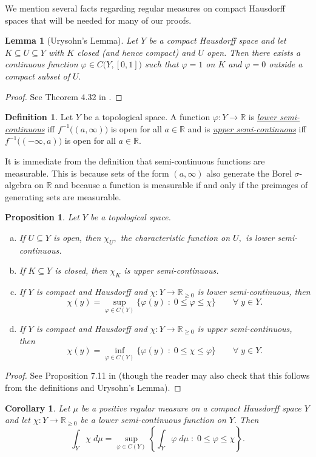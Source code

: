 \documentclass[12pt]{article}
\edef\t{\pgfmathresult}%
\theoremstyle{theorem}
\newtheorem{lemma}[equation]{Lemma}
\newtheorem{proposition}[equation]{Proposition}
\newtheorem{corollary}[equation]{Corollary}
\theoremstyle{definition}
\newtheorem{definition}[equation]{Definition}
\numberwithin{equation}{section}
\let\s=\sigma \let\t=\tau \let\u=\upsilon \let\f=\phi \let\c=\chi
\def\vf{\varphi}
\newcommand{\be}{\begin{equation}}
\newcommand{\ee}{\end{equation}}
\newcommand{\bc}{\begin{corollary}}
\newcommand{\ec}{\end{corollary}}
\newcommand{\blem}{\begin{lemma}}
\newcommand{\elem}{\end{lemma}}
\newcommand{\bn}{\begin{proposition}}
\newcommand{\en}{\end{proposition}}
\newcommand{\bd}{\begin{definition}}
\newcommand{\ed}{\end{definition}}
\newcommand{\bprf}{\begin{proof}}
\newcommand{\eprf}{\end{proof}}
\newcommand{\<}{\langle}
\renewcommand{\>}{\rangle}
\def\R{{{\mathbb R}}}
\begin{document}
We mention several facts regarding regular measures on compact
Hausdorff spaces that will be needed for many of our proofs. 

\blem
[Urysohn's Lemma]
\label{lem:Urysohn}
Let $Y$ be a compact Hausdorff space and let $K\subseteq U\subseteq Y$ with
$K$ closed (and hence compact) and $U$ open. 
Then there exists a continuous function $\vf\in C\big(Y,[0,1]\big)$ such that 
$\vf=1$ on $K$ and $\vf=0$ outside a compact subset of $U.$ 
\elem

\bprf
See Theorem 4.32 in \cite{Fo07}. 
\eprf

\bd
Let $Y$ be a topological space. A function $\vf:Y\to\R$ is
\emph{\uline{lower semi-continuous}} iff 
$f^{-1}\big((a,\infty)\big)$ is open for all $a\in\R$
and is 
\emph{\uline{upper semi-continuous}} iff 
$f^{-1}\big((-\infty,a)\big)$ is open for all $a\in\R.$
\ed

It is immediate from the definition that semi-continuous functions are
measurable. This is because sets of the form $(a,\infty)$ also generate
the Borel $\s$-algebra on $\R$ and because a function is measurable if and 
only if the preimages of generating sets are measurable.   

\bn
\label{prop:semicontinuous}
Let $Y$ be a topological space. 
\begin{enumerate}[(a)]
\setlength{\itemsep}{0pt}
\item
If $U\subseteq Y$ is open, then $\chi_{U},$ the characteristic
function on $U,$ is lower semi-continuous. 
\item
If $K\subseteq Y$ is closed, then $\chi_{K}$ is upper semi-continuous. 
\item
If $Y$ is compact and Hausdorff and $\chi:Y\to\R_{\ge0}$ is 
lower semi-continuous, then 
\be
\chi(y)=\sup_{\vf\in C(Y)}\big\{\vf(y)\;:\;0\le\vf\le\chi\big\}
\qquad\forall\;y\in Y.
\ee
\item
If $Y$ is compact and Hausdorff and $\chi:Y\to\R_{\ge0}$ is 
upper semi-continuous, then 
\be
\chi(y)=\inf_{\vf\in C(Y)}\big\{\vf(y)\;:\;0\le\chi\le\vf\big\}
\qquad\forall\;y\in Y.
\ee

\end{enumerate}
\en

\bprf
See Proposition 7.11 in  \cite{Fo07} (though the reader may also check that
this follows from the definitions and Urysohn's Lemma). 
\eprf

\bc
\label{cor:LSCintegralapprox}
Let $\mu$ be a positive regular measure on a compact Hausdorff space $Y$ 
and let $\chi:Y\to\R_{\ge0}$ be a lower semi-continuous function on $Y.$ Then
\be
\int_{Y}\chi\;d\mu=\sup_{\vf\in C(Y)}\left\{\int_{Y}\vf\;d\mu\;:\;0\le\vf\le\chi\right\}.
\ee
\ec
\end{document}
